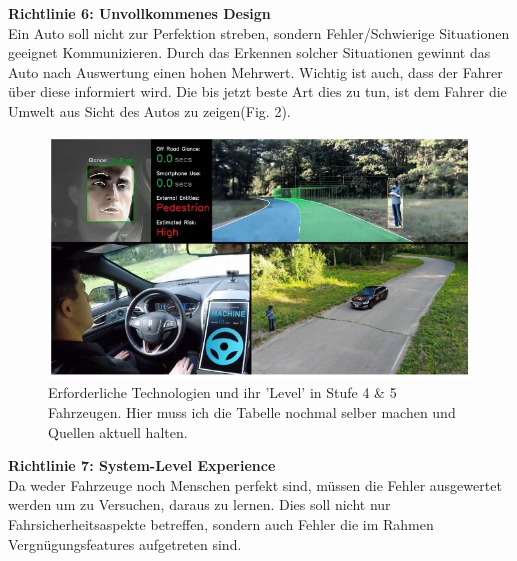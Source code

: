 \textbf{Richtlinie 6: Unvollkommenes Design}\\
Ein Auto soll nicht zur Perfektion streben, sondern Fehler/Schwierige Situationen geeignet Kommunizieren. Durch das Erkennen solcher Situationen gewinnt das Auto nach Auswertung einen hohen Mehrwert. Wichtig ist auch, dass der Fahrer über diese informiert wird. Die bis jetzt beste Art dies zu tun, ist dem Fahrer die Umwelt aus Sicht des Autos zu zeigen(Fig. 2).
\begin{figure}[H]
	\centering
	\includegraphics[width=0.734\columnwidth]{pictures/CarView.jpg}
	\caption{Erforderliche Technologien und ihr 'Level' in Stufe 4 \& 5 Fahrzeugen.
		Hier muss ich die Tabelle nochmal selber machen und Quellen aktuell halten.}
	\label{img:CarView}
\end{figure}

\textbf{Richtlinie 7: System-Level Experience}\\
Da weder Fahrzeuge noch Menschen perfekt sind, müssen die Fehler ausgewertet werden um zu Versuchen, daraus zu lernen. Dies soll nicht nur Fahrsicherheitsaspekte betreffen, sondern auch Fehler die im Rahmen Vergnügungsfeatures aufgetreten sind.